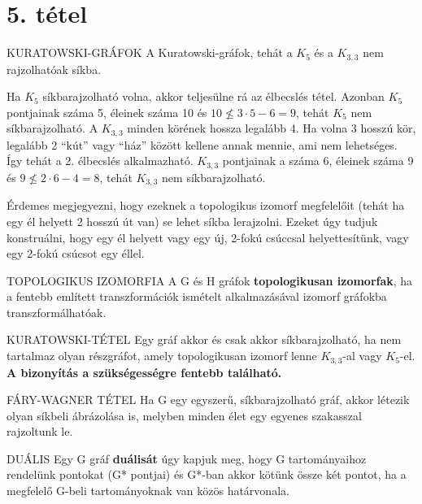 \section{5. tétel}

\begin{tetel}{KURATOWSKI-GRÁFOK}
A Kuratowski-gráfok, tehát a $K_5$ és a $K_{3,3}$ nem rajzolhatóak síkba.
\end{tetel}

\begin{bizonyitas}{}
Ha $K_5$ síkbarajzolható volna, akkor teljesülne rá az élbecslés tétel. Azonban $K_5$ pontjainak száma 5, éleinek száma 10 és $10 \not\leq 3 \cdot 5 -6 = 9$, tehát $K_5$ nem síkbarajzolható.
A $K_{3,3}$ minden körének hossza legalább 4. Ha volna 3 hosszú kör, legalább 2 ``kút'' vagy ``ház'' között kellene annak mennie, ami nem lehetséges. Így tehát a 2. élbecslés alkalmazható. $K_{3,3}$ pontjainak a száma 6, éleinek száma 9 és $9 \not\leq 2 \cdot 6 - 4 = 8$, tehát $K_{3,3}$ nem síkbarajzolható.
\end{bizonyitas}

Érdemes megjegyezni, hogy ezeknek a topologikus izomorf megfelelőit (tehát ha egy él helyett 2 hosszú út van) se lehet síkba lerajzolni. Ezeket úgy tudjuk konstruálni, hogy egy él helyett vagy egy új, 2-fokú csúccsal helyettesítünk, vagy egy 2-fokú csúcsot egy éllel.

\begin{definicio}{TOPOLOGIKUS IZOMORFIA}
A G és H gráfok \textbf{topologikusan izomorfak}, ha a fentebb említett transzformációk ismételt alkalmazásával izomorf gráfokba transzformálhatóak.
\end{definicio}

\begin{tetel}{KURATOWSKI-TÉTEL}
Egy gráf akkor és csak akkor síkbarajzolható, ha nem tartalmaz olyan részgráfot, amely topologikusan izomorf lenne $K_{3,3}$-al vagy $K_5$-el. \textbf{A bizonyítás a szükségességre fentebb található.}
\end{tetel}

\begin{tetel}{FÁRY-WAGNER TÉTEL}
Ha G egy egyszerű, síkbarajzolható gráf, akkor létezik olyan síkbeli ábrázolása is, melyben minden élet egy egyenes szakasszal rajzoltunk le.
\end{tetel}

\begin{definicio}{DUÁLIS}
Egy G gráf \textbf{duálisát} úgy kapjuk meg, hogy G tartományaihoz rendelünk pontokat (G* pontjai) és G*-ban akkor kötünk össze két pontot, ha a megfelelő G-beli tartományoknak van közös határvonala.
\end{definicio}

